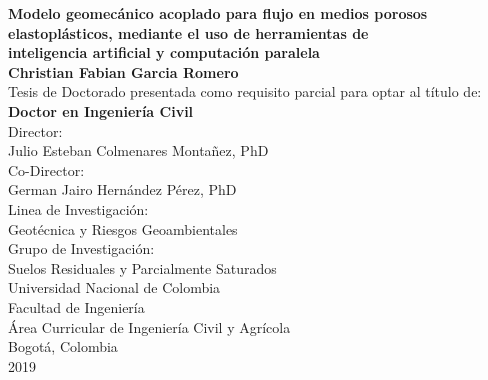 
\newpage
\begin{center}
\thispagestyle{empty} 

\textbf{\Huge Modelo geomecánico acoplado para flujo en medios porosos elastoplásticos, mediante el uso de herramientas de }\\[0.21cm]
\textbf{\Huge inteligencia artificial y computación paralela}\\[2.3cm]

\LARGE\textbf{Christian Fabian Garcia Romero}\\[2.3cm]

\normalsize Tesis de Doctorado presentada como requisito parcial para optar al título de:\\
\textbf{Doctor en Ingeniería Civil}\\[1.5cm]

Director:\\
Julio Esteban Colmenares Montañez, PhD\\[0.2cm]

Co-Director:\\
German Jairo Hernández Pérez, PhD\\[1.5cm]

Linea de Investigación:\\
Geotécnica y Riesgos Geoambientales\\[0.2cm]

Grupo de Investigación:\\
Suelos Residuales y Parcialmente Saturados \\[1.5cm]

\small Universidad Nacional de Colombia\\
Facultad de Ingeniería\\
Área Curricular de Ingeniería Civil y Agrícola\\
Bogotá, Colombia\\
2019\\
\end{center}

